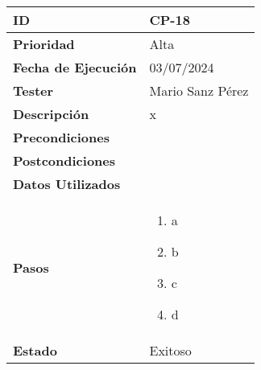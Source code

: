 \begin{longtable}{>{\raggedright\arraybackslash}p{4cm} p{9.5cm}}
	\hline
	\rowcolor{gray!20}
	\textbf{ID} & CP-18\\
	\hline
	\rowcolor{white}
	\textbf{Prioridad} & Alta \\
	\hline
	\rowcolor{gray!20}
	\textbf{Fecha de Ejecución} & 03/07/2024 \\
	\hline
	\rowcolor{white}
	\textbf{Tester} & Mario Sanz Pérez \\
	\hline
	\rowcolor{gray!20}
	\textbf{Descripción} & x\\
	\hline
	\rowcolor{white}
	\textbf{Precondiciones} & \\
	\hline
	\rowcolor{gray!20}
	\textbf{Postcondiciones} & \\
	\hline
	\rowcolor{white}
	\textbf{Datos Utilizados} & \\
	\hline
	\rowcolor{gray!20}
	\textbf{Pasos} & \begin{enumerate}
		\item a
		\item b
		\item c
		\item d
	\end{enumerate}\\
	\hline
	\rowcolor{white}
	\textbf{Estado} & Exitoso\\
	\hline
\end{longtable}